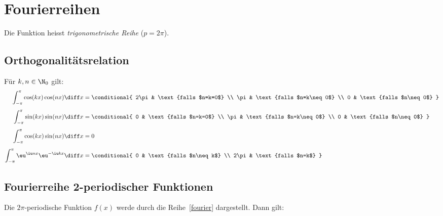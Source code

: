 
\section{Fourierreihen} %
	
	\begin{definition}
		Die Funktion
		heisst \emph{trigonometrische Reihe} ($p=2\pi$).
	\end{definition}
	
	\subsection{Orthogonalitätsrelation} %
		Für $k,n \in \N_0$ gilt:
		\begin{align*}
			\int_{-\pi}^\pi \cos(kx)\cos(nx) \diff x &= \conditional{
				2\pi & \text{falls $n=k=0$} \\
				\pi & \text{falls $n=k\neq0$} \\
				0 & \text{falls $n\neq0$}
			}
			\\[1ex]
			\int_{-\pi}^\pi \sin(kx)\sin(nx) \diff x &= \conditional{
				0 & \text{falls $n=k=0$} \\
				\pi & \text{falls $n=k\neq0$} \\
				0 & \text{falls $n\neq0$}
			}
			\\[1ex]
			\int_{-\pi}^\pi \cos(kx)\sin(nx) \diff x &= 0
			\\[1ex]
			\int_{-\pi}^\pi \eu^{\iu nx}\eu^{-\iu kx} \diff x &= \conditional{
				0 & \text{falls $n\neq k$} \\
				2\pi & \text{falls $n=k$}
			}
		\end{align*}
	\subsection{Fourierreihe 2\latintext{}-periodischer Funktionen} %
		Die $2\pi$-periodische Funktion $f(x)$ werde durch die Reihe~\eqref{fourier}
		dargestellt. Dann gilt:
		
